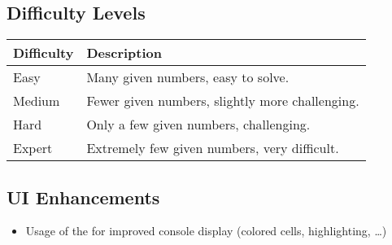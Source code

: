 \documentclass[
        paper=a4,       %
        fontsize=11pt,  %
        oneside,        %
        headsepline,    %
        notitlepage     %
]{scrartcl}             %
\begin{document}
\subsection{Difficulty Levels}
\begin{tabular}{|p{5cm}|p{10cm}|}
    \hline
    \textbf{Difficulty} & \textbf{Description} \\
    \hline
    Easy & Many given numbers, easy to solve. \\
    \hline
    Medium & Fewer given numbers, slightly more challenging. \\
    \hline
    Hard & Only a few given numbers, challenging. \\
    \hline
    Expert & Extremely few given numbers, very difficult. \\
    \hline
    \end{tabular}

\subsection{UI Enhancements}
\begin{itemize}
    \item Usage of the  for improved console display (colored cells, highlighting, \dots)
\end{itemize}
\end{document}
